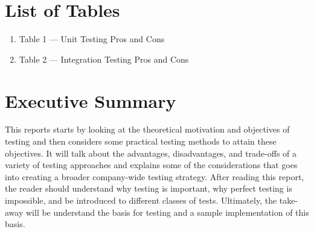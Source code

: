 \documentclass[12pt]{report}
\begin{document}
\section*{List of Tables}
\normalsize{}
\begin{enumerate}[label*={},leftmargin=*,labelsep=2ex,ref=\arabic*]
    \item Table 1 --- Unit Testing Pros and Cons 
    \item Table 2 --- Integration Testing Pros and Cons 

\end{enumerate}



\newpage\thispagestyle{fancy}\sectionfont{\scshape}
\section*{Executive Summary}

This reports starts by looking at the theoretical motivation and objectives of testing and then considers some practical testing methods to attain these objectives. It will talk about the advantages, disadvantages, and trade-offs of a variety of testing approaches and explains some of the considerations that goes into creating a broader company-wide testing strategy. After reading this report, the reader should understand why testing is important, why perfect testing is impossible, and be introduced to different classes of tests. Ultimately, the take-away will be understand the basis for testing and a sample implementation of this basis.



\newpage\thispagestyle{fancy}\sectionfont{\scshape}

\setcounter{page}{1}
\fancyfoot[C]{\thepage}
\end{document}
